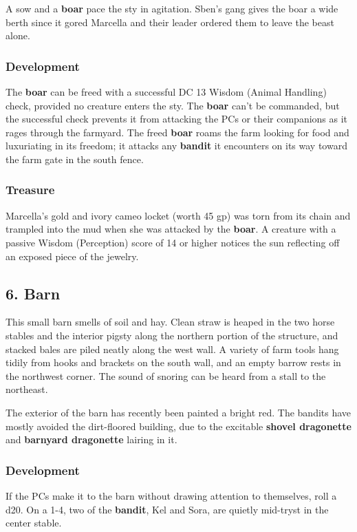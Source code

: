 \documentclass[10pt,a4paper,twoside,bg=print,twocolumn,openany,nodeprecatedcode]{dndbook}
\begin{document}
A sow and a \textbf{boar} pace the sty in agitation. Sben's gang gives the boar a wide berth since it gored Marcella and their leader ordered them to leave the beast alone.

\subsubsection{Development}
The \textbf{boar} can be freed with a successful DC 13 Wisdom (Animal Handling) check, provided no creature enters the sty. The \textbf{boar} can't be commanded, but the successful check prevents it from attacking the PCs or their companions as it rages through the farmyard. The freed \textbf{boar} roams the farm looking for food and luxuriating in its freedom; it attacks any \textbf{bandit} it encounters on its way toward the farm gate in the south fence.

\subsubsection{Treasure}
Marcella's gold and ivory cameo locket (worth 45 gp) was torn from its chain and trampled into the mud when she was attacked by the \textbf{boar}. A creature with a passive Wisdom (Perception) score of 14 or higher notices the sun reflecting off an exposed piece of the jewelry.

\subsection{6. Barn}
\begin{DndReadAloud}{}
This small barn smells of soil and hay. Clean straw is heaped in the two horse stables and the interior pigsty along the northern portion of the structure, and stacked bales are piled neatly along the west wall. A variety of farm tools hang tidily from hooks and brackets on the south wall, and an empty barrow rests in the northwest corner. The sound of snoring can be heard from a stall to the northeast.

\end{DndReadAloud}

The exterior of the barn has recently been painted a bright red. The bandits have mostly avoided the dirt-floored building, due to the excitable \textbf{shovel dragonette} and \textbf{barnyard dragonette} lairing in it.

\subsubsection{Development}
If the PCs make it to the barn without drawing attention to themselves, roll a d20. On a 1-4, two of the \textbf{bandit}, Kel and Sora, are quietly mid-tryst in the center stable.
\end{document}

